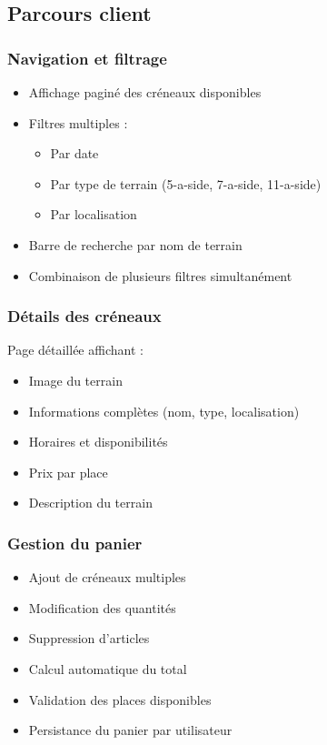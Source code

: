 \documentclass[12pt,a4paper]{article}
\begin{document}
\subsection{Parcours client}

\subsubsection{Navigation et filtrage}
\begin{itemize}
    \item Affichage paginé des créneaux disponibles
    \item Filtres multiples :
    \begin{itemize}
        \item Par date
        \item Par type de terrain (5-a-side, 7-a-side, 11-a-side)
        \item Par localisation
    \end{itemize}
    \item Barre de recherche par nom de terrain
    \item Combinaison de plusieurs filtres simultanément
\end{itemize}

\subsubsection{Détails des créneaux}
Page détaillée affichant :
\begin{itemize}
    \item Image du terrain
    \item Informations complètes (nom, type, localisation)
    \item Horaires et disponibilités
    \item Prix par place
    \item Description du terrain
\end{itemize}

\subsubsection{Gestion du panier}
\begin{itemize}
    \item Ajout de créneaux multiples
    \item Modification des quantités
    \item Suppression d'articles
    \item Calcul automatique du total
    \item Validation des places disponibles
    \item Persistance du panier par utilisateur
\end{itemize}
\end{document}
